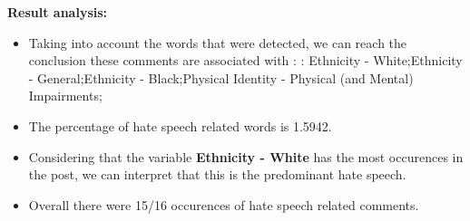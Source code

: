 \documentclass[11pt]{article}
\begin{document}
\textbf{\Large Result analysis:}

\begin{itemize}\item Taking into account the words that were detected, we can reach the conclusion these comments are associated with : : Ethnicity - White;Ethnicity - General;Ethnicity - Black;Physical Identity - Physical (and Mental) Impairments;%

\item The percentage of hate speech related words is 1.5942.

\item Considering that the variable \textbf{Ethnicity - White} has the most occurences in the post, we can interpret that this is the predominant hate speech.

\item Overall there were 15/16 occurences of hate speech related comments.\end{itemize}
\end{document}
